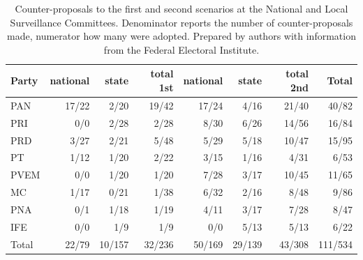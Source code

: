\documentclass[letter,12pt]{article}
\begin{document}
\begin{table}
\begin{center}
  \begin{tabular}{lrrr|rrr|r}
    Party & national & state  & total 1st & national & state  & total 2nd & Total \\ \hline
    PAN	  & 17/22    & 2/20   & 19/42     & 17/24    & 4/16   & 21/40     & 40/82 \\
    PRI	  & 0/0      & 2/28   & 2/28      & 8/30     & 6/26   & 14/56     & 16/84 \\
    PRD	  & 3/27     & 2/21   & 5/48      & 5/29     & 5/18   & 10/47     & 15/95 \\
    PT	  & 1/12     & 1/20   & 2/22      & 3/15     & 1/16   & 4/31      & 6/53 \\
    PVEM  & 0/0      & 1/20   & 1/20      & 7/28     & 3/17   & 10/45     & 11/65 \\
    MC    & 1/17     & 0/21   & 1/38      & 6/32     & 2/16   & 8/48      & 9/86 \\
    PNA   & 0/1      & 1/18   & 1/19      & 4/11     & 3/17   & 7/28      & 8/47 \\
    IFE   & 0/0      & 1/9    & 1/9       & 0/0      & 5/13   & 5/13      & 6/22 \\ \hline
    Total & 22/79    & 10/157 & 32/236    & 50/169   & 29/139 & 43/308    & 111/534 \\
  \end{tabular}
  \caption{Counter-proposals to the first and second scenarios at the National and Local Surveillance Committees. Denominator reports the number of counter-proposals made, numerator how many were adopted. Prepared by authors with information from the Federal Electoral Institute.}\label{T:counterprops}
\end{center}
\end{table}

\end{document}
